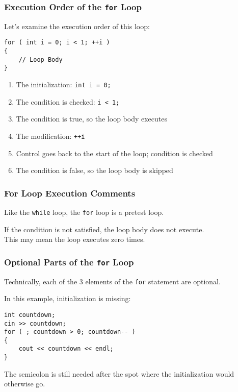 \begin{frame}[fragile]
\frametitle{Execution Order of the \texttt{for} Loop}

Let's examine the execution order of this loop:

\begin{verbatim}
for ( int i = 0; i < 1; ++i )
{
    // Loop Body
}
\end{verbatim}

\begin{enumerate}
	\item The initialization: \texttt{int i = 0;}
	\item The condition is checked: \texttt{i < 1;}
	\item The condition is true, so the loop body executes
	\item The modification: \texttt{++i}
	\item Control goes back to the start of the loop; condition is checked
	\item The condition is false, so the loop body is skipped
\end{enumerate}


\end{frame}

\begin{frame}
\frametitle{For Loop Execution Comments}

Like the \texttt{while} loop, the \texttt{for} loop is a pretest loop.

If the condition is not satisfied, the loop body does not execute.\\
\quad This may mean the loop executes zero times.

\end{frame}

\begin{frame}[fragile]
\frametitle{Optional Parts of the \texttt{for} Loop}

Technically, each of the 3 elements of the \texttt{for} statement are optional.

In this example, initialization is missing:

\begin{verbatim}
int countdown;
cin >> countdown;
for ( ; countdown > 0; countdown-- )
{
    cout << countdown << endl;
}
\end{verbatim}

The semicolon is still needed after the spot where the initialization would otherwise go.

\end{frame}

